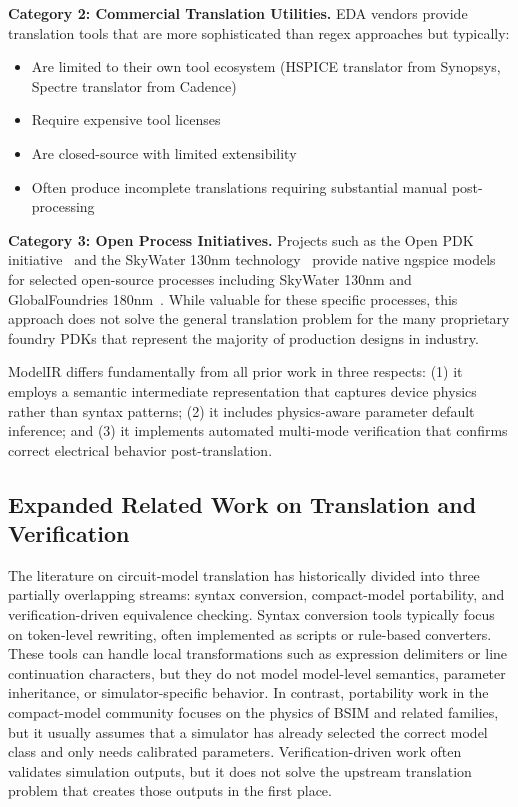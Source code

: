\documentclass[10pt,twocolumn]{article}
\begin{document}
\textbf{Category 2: Commercial Translation Utilities.} EDA vendors provide translation tools that are more sophisticated than regex approaches but typically:
\begin{itemize}
\item Are limited to their own tool ecosystem (HSPICE translator from Synopsys, Spectre translator from Cadence)
\item Require expensive tool licenses
\item Are closed-source with limited extensibility
\item Often produce incomplete translations requiring substantial manual post-processing
\end{itemize}

\textbf{Category 3: Open Process Initiatives.} Projects such as the Open PDK initiative~\cite{openpdk} and the SkyWater 130nm technology~\cite{skywater} provide native ngspice models for selected open-source processes including SkyWater 130nm and GlobalFoundries 180nm~\cite{gf180}. While valuable for these specific processes, this approach does not solve the general translation problem for the many proprietary foundry PDKs that represent the majority of production designs in industry.

ModelIR differs fundamentally from all prior work in three respects: (1) it employs a semantic intermediate representation that captures device physics rather than syntax patterns; (2) it includes physics-aware parameter default inference; and (3) it implements automated multi-mode verification that confirms correct electrical behavior post-translation.

\subsection{Expanded Related Work on Translation and Verification}

The literature on circuit-model translation has historically divided into three partially overlapping streams: syntax conversion, compact-model portability, and verification-driven equivalence checking. Syntax conversion tools typically focus on token-level rewriting, often implemented as scripts or rule-based converters. These tools can handle local transformations such as expression delimiters or line continuation characters, but they do not model model-level semantics, parameter inheritance, or simulator-specific behavior. In contrast, portability work in the compact-model community focuses on the physics of BSIM and related families, but it usually assumes that a simulator has already selected the correct model class and only needs calibrated parameters. Verification-driven work often validates simulation outputs, but it does not solve the upstream translation problem that creates those outputs in the first place.
\end{document}
